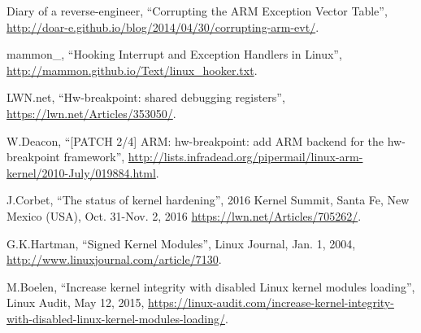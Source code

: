 \begin{thebibliography}{99}
Diary of a reverse-engineer,
``Corrupting the ARM Exception Vector Table'',
\url{http://doar-e.github.io/blog/2014/04/30/corrupting-arm-evt/}.

mammon\_,
``Hooking Interrupt and Exception Handlers in Linux'',
\url{http://mammon.github.io/Text/linux_hooker.txt}.

LWN.net,
``Hw-breakpoint: shared debugging registers'',
\url{https://lwn.net/Articles/353050/}.

W.Deacon,
``[PATCH 2/4] ARM: hw-breakpoint: add ARM backend for the hw-breakpoint framework'',
\url{http://lists.infradead.org/pipermail/linux-arm-kernel/2010-July/019884.html}.

J.Corbet,
``The status of kernel hardening'',
2016 Kernel Summit,
Santa Fe, New Mexico (USA), Oct. 31-Nov. 2, 2016
\url{https://lwn.net/Articles/705262/}.

G.K.Hartman,
``Signed Kernel Modules'',
Linux Journal,
Jan. 1, 2004,
\url{http://www.linuxjournal.com/article/7130}.

M.Boelen,
``Increase kernel integrity with disabled Linux kernel modules loading'',
Linux Audit,
May 12, 2015,
\url{https://linux-audit.com/increase-kernel-integrity-with-disabled-linux-kernel-modules-loading/}.

\end{thebibliography}
